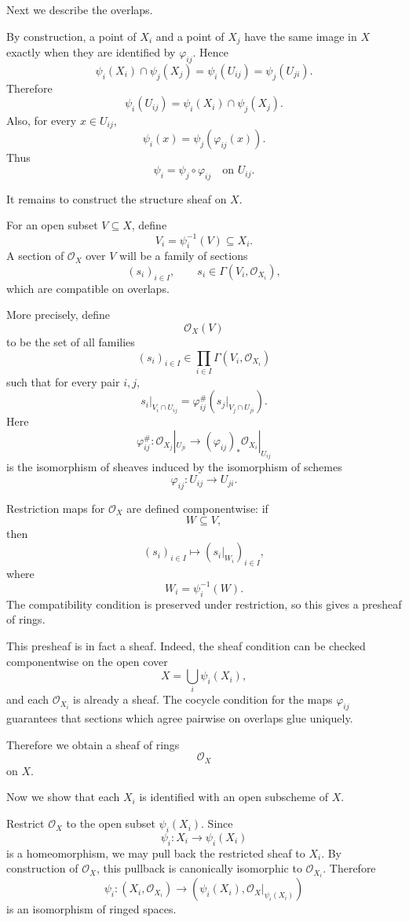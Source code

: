 Next we describe the overlaps.

By construction, a point of \(X_i\) and a point of \(X_j\) have the same image in \(X\) exactly when they are identified by \(\varphi_{ij}\). Hence
\[
\psi_i(X_i)\cap \psi_j(X_j)
=
\psi_i(U_{ij})
=
\psi_j(U_{ji}).
\]
Therefore
\[
\boxed{
	\psi_i(U_{ij})
	=
	\psi_i(X_i)\cap \psi_j(X_j).
}
\]
Also, for every \(x\in U_{ij}\),
\[
\psi_i(x)
=
\psi_j(\varphi_{ij}(x)).
\]
Thus
\[
\boxed{
	\psi_i=\psi_j\circ\varphi_{ij}
	\quad\text{on }U_{ij}.
}
\]

It remains to construct the structure sheaf on \(X\).

For an open subset \(V\subseteq X\), define
\[
V_i=\psi_i^{-1}(V)\subseteq X_i.
\]
A section of \(\mathcal O_X\) over \(V\) will be a family of sections
\[
(s_i)_{i\in I},
\qquad
s_i\in \Gamma(V_i,\mathcal O_{X_i}),
\]
which are compatible on overlaps.

More precisely, define
\[
\mathcal O_X(V)
\]
to be the set of all families
\[
(s_i)_{i\in I}\in \prod_{i\in I}\Gamma(V_i,\mathcal O_{X_i})
\]
such that for every pair \(i,j\),
\[
s_i|_{V_i\cap U_{ij}}
=
\varphi_{ij}^{\#}
\left(
s_j|_{V_j\cap U_{ji}}
\right).
\]
Here
\[
\varphi_{ij}^{\#}:
\mathcal O_{X_j}|_{U_{ji}}
\longrightarrow
(\varphi_{ij})_*\mathcal O_{X_i}|_{U_{ij}}
\]
is the isomorphism of sheaves induced by the isomorphism of schemes
\[
\varphi_{ij}:U_{ij}\to U_{ji}.
\]

Restriction maps for \(\mathcal O_X\) are defined componentwise:
if
\[
W\subseteq V,
\]
then
\[
(s_i)_{i\in I}
\longmapsto
(s_i|_{W_i})_{i\in I},
\]
where
\[
W_i=\psi_i^{-1}(W).
\]
The compatibility condition is preserved under restriction, so this gives a presheaf of rings.

This presheaf is in fact a sheaf. Indeed, the sheaf condition can be checked componentwise on the open cover
\[
X=\bigcup_i \psi_i(X_i),
\]
and each \(\mathcal O_{X_i}\) is already a sheaf. The cocycle condition for the maps \(\varphi_{ij}\) guarantees that sections which agree pairwise on overlaps glue uniquely.

Therefore we obtain a sheaf of rings
\[
\mathcal O_X
\]
on \(X\).

Now we show that each \(X_i\) is identified with an open subscheme of \(X\).

Restrict \(\mathcal O_X\) to the open subset \(\psi_i(X_i)\). Since
\[
\psi_i:X_i\to \psi_i(X_i)
\]
is a homeomorphism, we may pull back the restricted sheaf to \(X_i\). By construction of \(\mathcal O_X\), this pullback is canonically isomorphic to \(\mathcal O_{X_i}\). Therefore
\[
\psi_i:
(X_i,\mathcal O_{X_i})
\longrightarrow
(\psi_i(X_i),\mathcal O_X|_{\psi_i(X_i)})
\]
is an isomorphism of ringed spaces.

